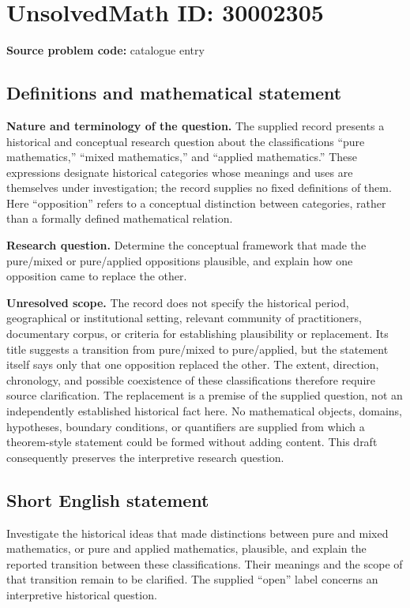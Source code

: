 \documentclass[11pt]{article}
\begin{document}
\section*{UnsolvedMath ID: 30002305}
\textbf{Source problem code:} catalogue entry
\subsection{Definitions and mathematical statement}
\textbf{Nature and terminology of the question.} The supplied record presents a historical and conceptual research question about the classifications ``pure mathematics,'' ``mixed mathematics,'' and ``applied mathematics.'' These expressions designate historical categories whose meanings and uses are themselves under investigation; the record supplies no fixed definitions of them. Here ``opposition'' refers to a conceptual distinction between categories, rather than a formally defined mathematical relation.

\textbf{Research question.} Determine the conceptual framework that made the pure/mixed or pure/applied oppositions plausible, and explain how one opposition came to replace the other.

\textbf{Unresolved scope.} The record does not specify the historical period, geographical or institutional setting, relevant community of practitioners, documentary corpus, or criteria for establishing plausibility or replacement. Its title suggests a transition from pure/mixed to pure/applied, but the statement itself says only that one opposition replaced the other. The extent, direction, chronology, and possible coexistence of these classifications therefore require source clarification. The replacement is a premise of the supplied question, not an independently established historical fact here. No mathematical objects, domains, hypotheses, boundary conditions, or quantifiers are supplied from which a theorem-style statement could be formed without adding content. This draft consequently preserves the interpretive research question.
\subsection{Short English statement}
Investigate the historical ideas that made distinctions between pure and mixed mathematics, or pure and applied mathematics, plausible, and explain the reported transition between these classifications. Their meanings and the scope of that transition remain to be clarified. The supplied ``open'' label concerns an interpretive historical question.
\end{document}
